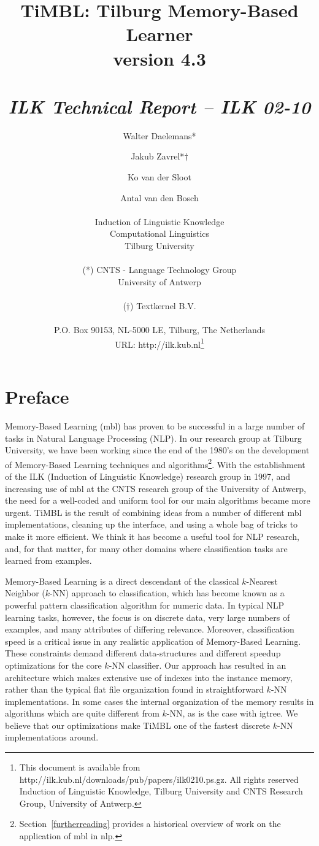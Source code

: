 \documentclass{report}
\author{Walter Daelemans* \and Jakub Zavrel*$\dagger$ \and Ko van der Sloot \and
	Antal van den Bosch\\ \ \\
	Induction of Linguistic Knowledge\\
	Computational Linguistics\\ 
        Tilburg University \\ \\
	(*) CNTS - Language Technology Group\\
	University of Antwerp\\ \\
	($\dagger$) Textkernel B.V.\\ \\
        P.O. Box 90153, NL-5000 LE, Tilburg, The Netherlands \\ 
        URL: http://ilk.kub.nl\thanks{This document is available from
	http://ilk.kub.nl/downloads/pub/papers/ilk0210.ps.gz. All rights reserved
	Induction of Linguistic Knowledge, Tilburg University and 
        CNTS Research Group, University of Antwerp.}}
\title{{\huge TiMBL: Tilburg Memory-Based Learner} \\ \vspace*{0.5cm}
{\bf version 4.3} \\ \vspace*{0.5cm}{\huge Reference Guide}\\
\vspace*{1cm} {\it ILK Technical Report -- ILK 02-10}}
\begin{document}

\maketitle

\tableofcontents

\chapter*{Preface}

Memory-Based Learning ({\sc mbl}) has proven to be successful in a
large number of tasks in Natural Language Processing (NLP). In our
research group at Tilburg University, we have been working since the
end of the 1980's on the development of Memory-Based Learning
techniques and algorithms\footnote{Section~\ref{furtherreading}
provides a historical overview of work on the application of {\sc
mbl} in {\sc nlp}.}. With the establishment of the ILK (Induction of
Linguistic Knowledge) research group in 1997, and increasing use of
{\sc mbl} at the CNTS research group of the University of Antwerp, the
need for a well-coded and uniform tool for our main algorithms became
more urgent. TiMBL is the result of combining ideas from a number of
different {\sc mbl} implementations, cleaning up the interface, and
using a whole bag of tricks to make it more efficient. We think it has
become a useful tool for NLP research, and, for that matter, for many
other domains where classification tasks are learned from examples.

Memory-Based Learning is a direct descendant of the classical
$k$-Nearest Neighbor ($k$-NN) approach to classification, which has
become known as a powerful pattern classification algorithm for
numeric data. In typical NLP learning tasks, however, the focus is on
discrete data, very large numbers of examples, and many attributes of
differing relevance. Moreover, classification speed is a critical
issue in any realistic application of Memory-Based Learning. These
constraints demand different data-structures and different speedup
optimizations for the core $k$-NN classifier. Our approach has
resulted in an architecture which makes extensive use of indexes into
the instance memory, rather than the typical flat file organization
found in straightforward $k$-NN implementations. In some cases the
internal organization of the memory results in algorithms which are
quite different from $k$-NN, as is the case with {\sc igtree}. We
believe that our optimizations make TiMBL one of the fastest discrete
$k$-NN implementations around.
\end{document}
